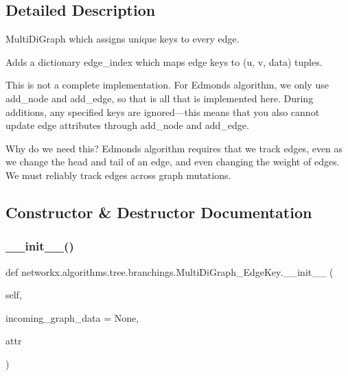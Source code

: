 \subsection{Detailed Description}
\begin{DoxyVerb}MultiDiGraph which assigns unique keys to every edge.

Adds a dictionary edge_index which maps edge keys to (u, v, data) tuples.

This is not a complete implementation. For Edmonds algorithm, we only use
add_node and add_edge, so that is all that is implemented here. During
additions, any specified keys are ignored---this means that you also
cannot update edge attributes through add_node and add_edge.

Why do we need this? Edmonds algorithm requires that we track edges, even
as we change the head and tail of an edge, and even changing the weight
of edges. We must reliably track edges across graph mutations.\end{DoxyVerb}
 

\subsection{Constructor \& Destructor Documentation}
\mbox{\label{classnetworkx_1_1algorithms_1_1tree_1_1branchings_1_1MultiDiGraph__EdgeKey_a66fc427388e7410222ca3b593d560a16}} 
\subsubsection{\texorpdfstring{\+\_\+\+\_\+init\+\_\+\+\_\+()}{\_\_init\_\_()}}
{\footnotesize\ttfamily def networkx.\+algorithms.\+tree.\+branchings.\+Multi\+Di\+Graph\+\_\+\+Edge\+Key.\+\_\+\+\_\+init\+\_\+\+\_\+ (\begin{DoxyParamCaption}\item[{}]{self,  }\item[{}]{incoming\+\_\+graph\+\_\+data = {\ttfamily None},  }\item[{}]{attr }\end{DoxyParamCaption})}



